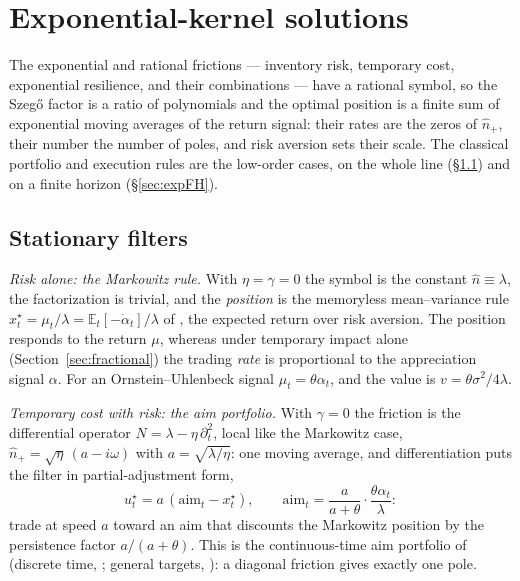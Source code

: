 \documentclass[11pt]{article}
\newcommand{\E}{\mathbb{E}}
\theoremstyle{plain}
\theoremstyle{definition}
\theoremstyle{remark}
\begin{document}
\section{Exponential-kernel solutions}\label{sec:recovery}

The exponential and rational frictions --- inventory risk, temporary cost, exponential resilience, and their combinations --- have a rational symbol, so the Szeg\H{o} factor is a ratio of polynomials and the optimal position is a finite sum of exponential moving averages of the return signal: their rates are the zeros of $\hat n_+$, their number the number of poles, and risk aversion sets their scale. The classical portfolio and execution rules are the low-order cases, on the whole line (\S\ref{sec:rational}) and on a finite horizon (\S\ref{sec:expFH}).

\subsection{Stationary filters}\label{sec:rational}

\emph{Risk alone: the Markowitz rule.} With $\eta=\gamma=0$ the symbol is the constant $\hat n\equiv\lambda$, the factorization is trivial, and the \emph{position} is the memoryless mean--variance rule $x^\star_t=\mu_t/\lambda=\E_t[-\dot\alpha_t]/\lambda$ of \citet{Markowitz1952,Merton1971}, the expected return over risk aversion. The position responds to the return $\mu$, whereas under temporary impact alone (Section~\ref{sec:fractional}) the trading \emph{rate} is proportional to the appreciation signal $\alpha$. For an Ornstein--Uhlenbeck signal $\mu_t=\theta\alpha_t$, and the value is $v=\theta\sigma^2/4\lambda$.

\emph{Temporary cost with risk: the aim portfolio.} With $\gamma=0$ the friction is the differential operator $N=\lambda-\eta\,\partial_t^2$, local like the Markowitz case, $\hat n_+=\sqrt\eta\,(a-i\omega)$ with $a=\sqrt{\lambda/\eta}$: one moving average, and differentiation puts the filter in partial-adjustment form,
\begin{equation}\label{eq:gp}
u^\star_t = a\,(\mathrm{aim}_t - x^\star_t), \qquad
\mathrm{aim}_t = \frac{a}{a+\theta}\cdot\frac{\theta\alpha_t}{\lambda}:
\end{equation}
trade at speed $a$ toward an aim that discounts the Markowitz position by the persistence factor $a/(a+\theta)$. This is the continuous-time aim portfolio of \citet{GarleanuPedersen2016} (discrete time, \citet{GarleanuPedersen2013}; general targets, \citet{BankSonerVoss2017}): a diagonal friction gives exactly one pole.
\end{document}
